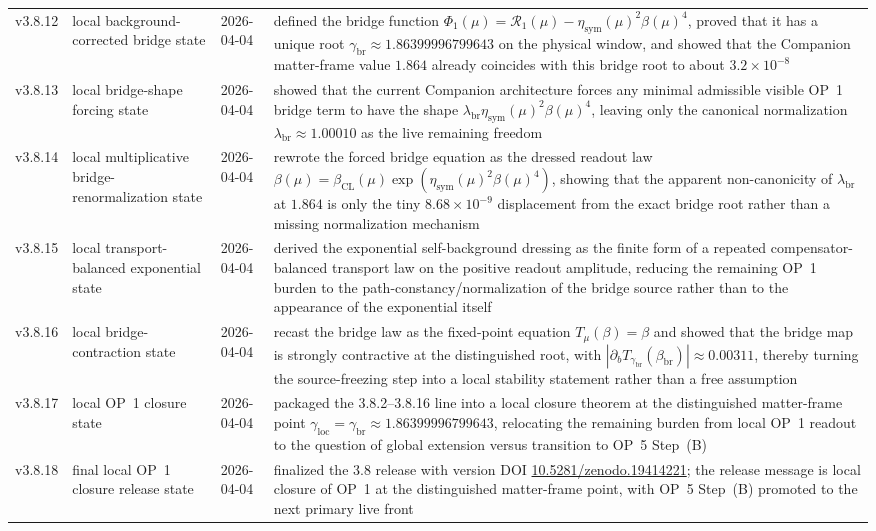 {\begin{longtable}{|p{}|p{}|p{}|p{}|}
v3.8.12 & local background-corrected bridge state & 2026-04-04 & defined the bridge function \(\Phi_1(\mu)=\mathcal R_1(\mu)-\eta_{\mathrm{sym}}(\mu)^2\beta(\mu)^4\), proved that it has a unique root \(\gamma_{\mathrm{br}}\approx 1.86399996799643\) on the physical window, and showed that the Companion matter-frame value \(1.864\) already coincides with this bridge root to about \(3.2\times10^{-8}\) \\
v3.8.13 & local bridge-shape forcing state & 2026-04-04 & showed that the current Companion architecture forces any minimal admissible visible OP~1 bridge term to have the shape \(\lambda_{\mathrm{br}}\eta_{\mathrm{sym}}(\mu)^2\beta(\mu)^4\), leaving only the canonical normalization \(\lambda_{\mathrm{br}}\approx 1.00010\) as the live remaining freedom \\
v3.8.14 & local multiplicative bridge-renormalization state & 2026-04-04 & rewrote the forced bridge equation as the dressed readout law \(\beta(\mu)=\beta_{\mathrm{CL}}(\mu)\exp(\eta_{\mathrm{sym}}(\mu)^2\beta(\mu)^4)\), showing that the apparent non-canonicity of \(\lambda_{\mathrm{br}}\) at \(1.864\) is only the tiny \(8.68\times10^{-9}\) displacement from the exact bridge root rather than a missing normalization mechanism \\
v3.8.15 & local transport-balanced exponential state & 2026-04-04 & derived the exponential self-background dressing as the finite form of a repeated compensator-balanced transport law on the positive readout amplitude, reducing the remaining OP~1 burden to the path-constancy/normalization of the bridge source rather than to the appearance of the exponential itself \\
v3.8.16 & local bridge-contraction state & 2026-04-04 & recast the bridge law as the fixed-point equation \(T_\mu(\beta)=\beta\) and showed that the bridge map is strongly contractive at the distinguished root, with \(|\partial_b T_{\gamma_{\mathrm{br}}}(\beta_{\mathrm{br}})|\approx 0.00311\), thereby turning the source-freezing step into a local stability statement rather than a free assumption \\
v3.8.17 & local OP~1 closure state & 2026-04-04 & packaged the 3.8.2--3.8.16 line into a local closure theorem at the distinguished matter-frame point \(\gamma_{\mathrm{loc}}=\gamma_{\mathrm{br}}\approx 1.86399996799643\), relocating the remaining burden from local OP~1 readout to the question of global extension versus transition to OP~5 Step~(B) \\
v3.8.18 & final local OP~1 closure release state & 2026-04-04 & finalized the 3.8 release with version DOI \href{https://doi.org/10.5281/zenodo.19414221}{10.5281/zenodo.19414221}; the release message is local closure of OP~1 at the distinguished matter-frame point, with OP~5 Step~(B) promoted to the next primary live front \\

\end{longtable}}
